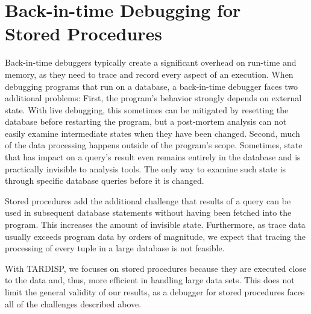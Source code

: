 \documentclass[english,conference,final]{IEEEtran}
\newcommand{\tool}{TAR\-DISP}
\begin{document}


\section{Back-in-time Debugging for\texorpdfstring{\\ }{ }Stored Procedures}
\label{sec:prototype}

Back-in-time debuggers typically create a significant overhead on run-time and memory, as they need to trace and record every aspect of an execution.
When debugging programs that run on a database, a back-in-time debugger faces two additional problems:
First, the program's behavior strongly depends on external state.
With live debugging, this sometimes can be mitigated by resetting the database before restarting the program, but a post-mortem analysis can not easily examine intermediate states when they have been changed.
Second, much of the data processing happens outside of the program's scope.
Sometimes, state that has impact on a query's result even remains entirely in the database and is practically invisible to analysis tools.
The only way to examine such state is through specific database queries before it is changed.

Stored procedures add the additional challenge that results of a query can be used in subsequent database statements without having been fetched into the program.
This increases the amount of invisible state.
Furthermore, as trace data usually exceeds program data by orders of magnitude, we expect that tracing the processing of every tuple in a large database is not feasible.

With \tool, we focuses on stored procedures because they are executed close to the data and, thus, more efficient in handling large data sets.
This does not limit the general validity of our results, as a debugger for stored procedures faces all of the challenges described above.
\end{document}
